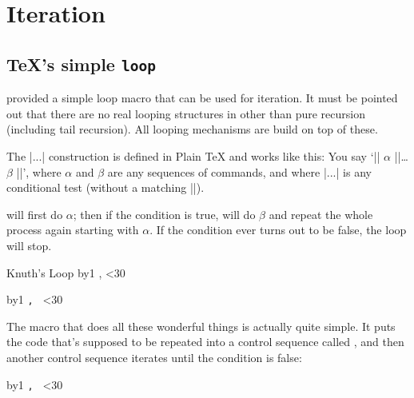 \documentclass{ltxdoc}
\begin{document}

\chapter{Iteration}
\section*{\TeX's simple \protect\texttt{loop}}



 provided a simple loop macro that can be used for iteration. It must be pointed out that there are no real looping structures in \tex other than pure recursion (including tail recursion). All looping mechanisms are build on top of these.

The |\loop...\repeat| construction is defined in Plain TeX and works like this:
You say `|\loop| $\alpha$ |\if|\dots $\beta$  |\repeat|', where $\alpha$ and $\beta$ are any sequences of
commands, and where |\if...| is any conditional test (without a matching |\fi|). 

\tex
will first do $\alpha$; then if the condition is true, \tex will do $\beta$ and repeat the whole process
again starting with $\alpha$. If the condition ever turns out to be false, the loop will stop.

\begin{texexample}{Knuth's Loop}{}
\bgroup
\newcount\n
{}
\loop
   \advance\n by1
     \number\n,   
   \ifnum\n<30
\repeat
\egroup
\end{texexample}



{\noindent
\newcount\n
{}
\loop%
   \advance\n by1
     \texttt{\number\n, }%
   \ifnum\n<30%
\repeat%
}

The \cmd{\loop} macro that does all these wonderful things is actually quite simple.
It puts the code that's supposed to be repeated into a control sequence called
\cmd{\body}, and then another control sequence iterates until the condition is false:

\begin{teX}
\def\loop#1\repeat{\def\body{#1}\iterate}
\def\iterate{\body\let\next=\iterate\else\let\next=\relax\fi\next}
\end{teX}


\noindent\colorbox{gray!10}{\parbox{10cm}{\noindent
\newcount\n
{}
\loop
   \advance\n by1
     \texttt{\number\n, } 
   \ifnum\n<30
\repeat
}}
\bigskip
\end{document}
